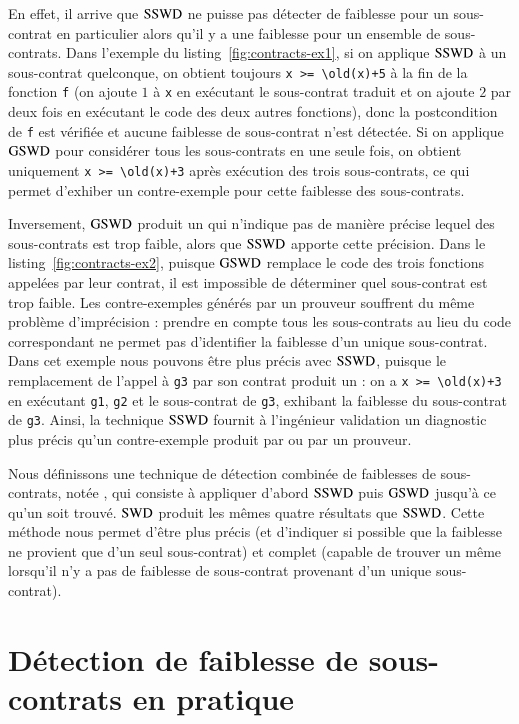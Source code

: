 En effet, il arrive que $\mathrm{SSWD}$ ne puisse pas détecter de faiblesse pour un
sous-contrat en particulier alors qu'il y a une faiblesse pour un ensemble de
sous-contrats.
Dans l'exemple du listing~\ref{fig:contracts-ex1}, si on applique $\mathrm{SSWD}$ à
un sous-contrat quelconque, on obtient toujours \lstinline'x >= \old(x)+5' à la
fin de la fonction \lstinline'f' (on ajoute $1$ à \lstinline'x' en exécutant le
sous-contrat traduit et on ajoute $2$ par deux fois en exécutant le code des
deux autres fonctions), donc la postcondition de \lstinline'f' est vérifiée et
aucune faiblesse de sous-contrat n'est détectée.
Si on applique $\mathrm{GSWD}$ pour considérer tous les sous-contrats en une seule fois,
on obtient uniquement \lstinline'x >= \old(x)+3' après exécution des trois
sous-contrats, ce qui permet d'exhiber un contre-exemple pour cette faiblesse
des sous-contrats.

Inversement, $\mathrm{GSWD}$ produit un \GSWCE qui n'indique pas de manière précise
lequel des sous-contrats est trop faible, alors que $\mathrm{SSWD}$ apporte cette
précision.
Dans le listing~\ref{fig:contracts-ex2}, puisque $\mathrm{GSWD}$ remplace le code des
trois fonctions appelées par leur contrat, il est impossible de déterminer quel
sous-contrat est trop faible.
Les contre-exemples générés par un prouveur souffrent du même problème
d'imprécision : prendre en compte tous les sous-contrats au lieu du code
correspondant ne permet pas d'identifier la faiblesse d'un unique sous-contrat.
Dans cet exemple nous pouvons être plus précis avec $\mathrm{SSWD}$, puisque le
remplacement de l'appel à \lstinline'g3' par son contrat produit un \SSWCE :
on a \lstinline'x >= \old(x)+3' en exécutant
\lstinline'g1',  \lstinline'g2' et le sous-contrat de \lstinline'g3',
exhibant la faiblesse du sous-contrat de \lstinline'g3'.
Ainsi, la technique $\mathrm{SSWD}$ fournit à l'ingénieur validation un diagnostic plus
précis qu'un contre-exemple produit par \GSWD ou par un prouveur.

Nous définissons une technique de détection combinée de faiblesses de
sous-contrats, notée \SWD, qui consiste à appliquer d'abord $\mathrm{SSWD}$ puis $\mathrm{GSWD}$
jusqu'à ce qu'un \SWCE soit trouvé. 
$\mathrm{SWD}$ produit les mêmes quatre résultats que $\mathrm{SSWD}$.
Cette méthode nous permet d'être plus précis (et d'indiquer si possible que la
faiblesse ne provient que d'un seul sous-contrat) et complet (capable de trouver
un \GSWCE même lorsqu'il n'y a pas de faiblesse de sous-contrat provenant d'un
unique sous-contrat).


\section{Détection de faiblesse de sous-contrats en pratique}
\label{sec:swd-scenarios}


